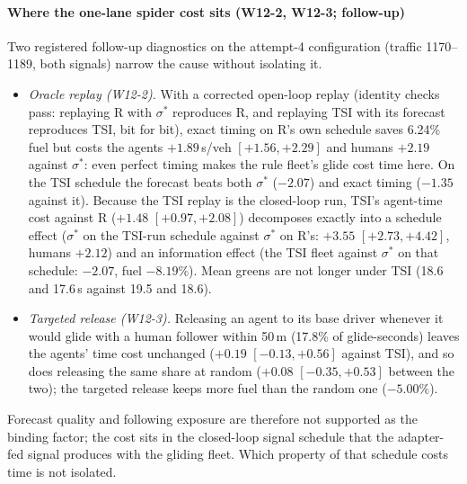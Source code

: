 \paragraph{Where the one-lane spider cost sits (W12-2, W12-3; follow-up)} Two registered follow-up diagnostics on the attempt-4
configuration (traffic 1170--1189, both signals) narrow the cause without isolating it.
\begin{itemize}\setlength\itemsep{1pt}
\item \emph{Oracle replay (W12-2).} With a corrected open-loop replay (identity checks pass: replaying R with $\sigma^*$ reproduces R,
and replaying TSI with its forecast reproduces TSI, bit for bit), exact timing on R's own schedule saves 6.24\% fuel but costs the agents
$+1.89$\,s/veh $[+1.56,+2.29]$ and humans $+2.19$ against $\sigma^*$: even perfect timing makes the rule fleet's glide cost time here.
On the TSI schedule the forecast beats both $\sigma^*$ ($-2.07$) and exact timing ($-1.35$ against it). Because the TSI replay is the
closed-loop run, TSI's agent-time cost against R ($+1.48$ $[+0.97,+2.08]$) decomposes exactly into a schedule effect ($\sigma^*$ on the
TSI-run schedule against $\sigma^*$ on R's: $+3.55$ $[+2.73,+4.42]$, humans $+2.12$) and an information effect (the TSI fleet against
$\sigma^*$ on that schedule: $-2.07$, fuel $-8.19\%$). Mean greens are not longer under TSI (18.6 and 17.6\,s against 19.5 and 18.6).
\item \emph{Targeted release (W12-3).} Releasing an agent to its base driver whenever it would glide with a human follower within
50\,m (17.8\% of glide-seconds) leaves the agents' time cost unchanged ($+0.19$ $[-0.13,+0.56]$ against TSI), and so does releasing the
same share at random ($+0.08$ $[-0.35,+0.53]$ between the two); the targeted release keeps more fuel than the random one ($-5.00\%$).
\end{itemize}
Forecast quality and following exposure are therefore not supported as the binding factor; the cost sits in the closed-loop signal
schedule that the adapter-fed signal produces with the gliding fleet. Which property of that schedule costs time is not isolated.
